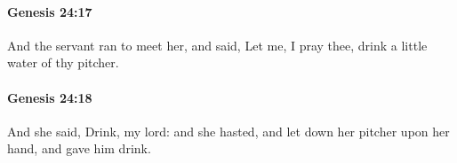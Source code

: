 		\paragraph{Genesis 24:17} %
			\label{GENESIS-24-17}

			And the servant ran to meet her, and said, Let me, I pray thee, drink a little water of thy pitcher.


		\paragraph{Genesis 24:18} %
			\label{GENESIS-24-18}

			And she said, Drink, my lord: and she hasted, and let down her pitcher upon her hand, and gave him drink.


